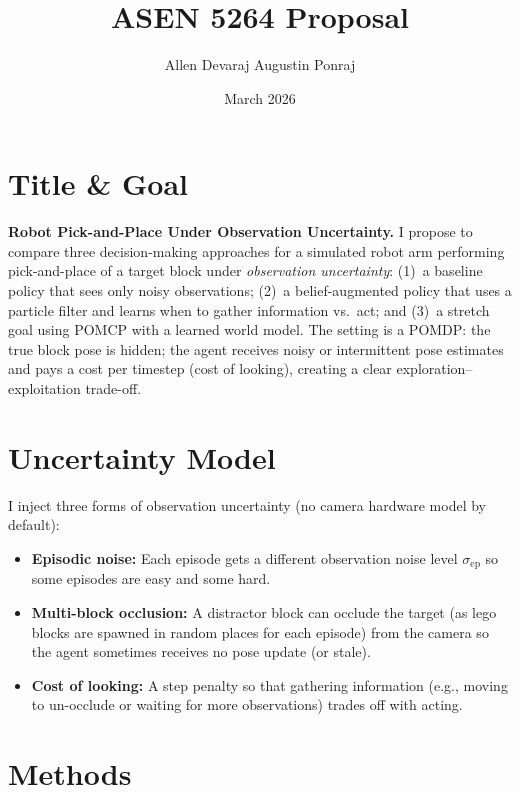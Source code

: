 \documentclass{article}
\title{ASEN 5264 Proposal}
\author{Allen Devaraj Augustin Ponraj}
\date{March 2026}
\begin{document}
\maketitle
\vspace{-12pt}

\section{Title \& Goal}

\textbf{Robot Pick-and-Place Under Observation Uncertainty.} I propose to compare three decision-making approaches for a simulated robot arm performing pick-and-place of a target block under \emph{observation uncertainty}: (1)~a baseline policy that sees only noisy observations; (2)~a belief-augmented policy that uses a particle filter and learns when to gather information vs.\ act; and (3)~a stretch goal using POMCP with a learned world model. The setting is a POMDP: the true block pose is hidden; the agent receives noisy or intermittent pose estimates and pays a cost per timestep (cost of looking), creating a clear exploration--exploitation trade-off.

\section{Uncertainty Model}

I inject three forms of observation uncertainty (no camera hardware model by default):

\begin{itemize}
  \item \textbf{Episodic noise:} Each episode gets a different observation noise level $\sigma_{\text{ep}}$ so some episodes are easy and some hard.
  \item \textbf{Multi-block occlusion:} A distractor block can occlude the target (as lego blocks are spawned in random places for each episode) from the camera so the agent sometimes receives no pose update (or stale).
  \item \textbf{Cost of looking:} A step penalty so that gathering information (e.g., moving to un-occlude or waiting for more observations) trades off with acting.
\end{itemize}

\section{Methods}
\end{document}
